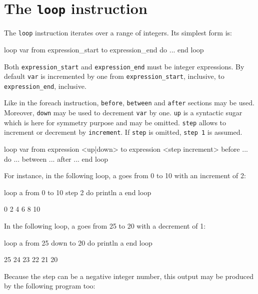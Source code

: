 \documentclass[10pt,openright,twosides]{report}
\newcommand{\var}[1]{{\small\ttfamily #1}}
\newcommand{\gtlinline}[1]{\colorbox{light-blue}{\lstinline[language=gtl]{#1}}}
\begin{document}
\section{The \texttt{loop} instruction}

The \gtlinline{loop} instruction iterates over a range of integers. Its simplest form is:

\begin{gtl}
loop var from expression_start to expression_end do
  ...
end loop
\end{gtl}

Both \gtlinline{expression_start} and \gtlinline{expression_end} must be integer expressions. By default \gtlinline{var} is incremented by one from \gtlinline{expression_start}, inclusive, to \gtlinline{expression_end}, inclusive. 

Like in the foreach instruction, \gtlinline{before},  \gtlinline{between} and \gtlinline{after} sections may be used. Moreover, \gtlinline{down} may be used to decrement \gtlinline{var} by one. \gtlinline{up} is a syntactic sugar which is here for symmetry purpose and may be omitted. \gtlinline{step} allows to increment or decrement by \gtlinline{increment}. If \gtlinline{step} is omitted, \gtlinline{step 1} is assumed.

\begin{gtl}
loop var from expression <up|down> to expression <step increment>
  before ...
  do ...
  between ...
  after ...
end loop
\end{gtl}

\noindent For instance, in the following loop, \var{a} goes from 0 to 10 with an increment of 2:

\begin{gtl}
loop a from 0 to 10 step 2 do
  println a
end loop
\end{gtl}

\begin{console}
0
2
4
6
8
10
\end{console}

\noindent In the following loop, \var{a} goes from 25 to 20 with a decrement of 1:

\begin{gtl}
loop a from 25 down to 20 do
  println a
end loop
\end{gtl}

\begin{console}
25
24
23
22
21
20
\end{console}

\noindent Because the step can be a negative integer number, this output may be produced by the following program too:
\end{document}
